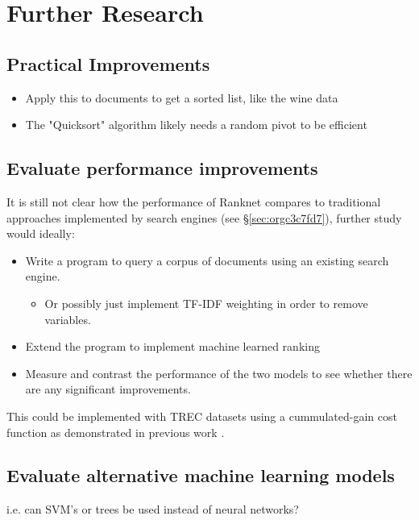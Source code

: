 \documentclass[a4paper,11pt,twoside]{article}
\begin{document}
\section{Further Research}
\label{sec:org34c687f}


\subsection{Practical Improvements}
\label{sec:orgb11772e}

\begin{itemize}
\item Apply this to documents to get a sorted list, like the wine data
\item The "Quicksort" algorithm likely needs a random pivot to be efficient \cite{timroughgardenQuicksortOverview2017}
\end{itemize}

\subsection{Evaluate performance improvements}
\label{sec:orgab5dd90}

It is still not clear how the
performance of Ranknet compares to traditional approaches
implemented by search engines (see \S \ref{sec:orgc3c7fd7}), further
study would ideally:

\begin{itemize}
\item Write a program to query a corpus of documents using an existing search engine.
\begin{itemize}
\item Or possibly just implement TF-IDF weighting in order to remove variables.
\end{itemize}
\item Extend the program to implement machine learned ranking
\item Measure and contrast the performance of the two models to see
whether there are any significant improvements.
\end{itemize}

This could be implemented with TREC datasets
\cite{usnationalinstituteofstandardsandtechnologyTextREtrievalConference}
using a cummulated-gain cost function
\cite{jarvelinCumulatedGainbasedEvaluation2002} as demonstrated in
previous work \cite{viksinghComparisonOpenSource2009}.

\subsection{Evaluate alternative machine learning models}
\label{sec:orgbab0c14}
i.e. can SVM's or trees be used instead of neural networks?
\end{document}
